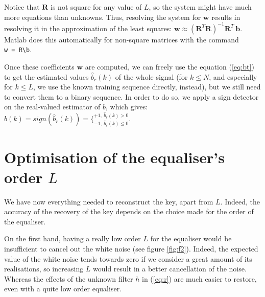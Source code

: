 \documentclass[twocolumn, 12pt]{IEEEtran}
\begin{document}
Notice that $\bm{R}$ is not square for any value of $L$, so the system might have much more equations than unknowns. Thus, resolving the system for $\bm{w}$ results in resolving it in the approximation of the least squares: $\bm{w} \approx (\bm{R}^{T}\bm{R})^{-1}\bm{R}^{T}~\bm{b}$. Matlab does this automatically for non-square matrices with the command \texttt{w~=~R\textbackslash b}.

Once these coefficients $\bm{w}$ are computed, we can freely use the equation (\ref{eq:bt}) to get the estimated values $\hat{b}_{r}(k)$ of the whole signal (for $k \leq N$, and especially for $k \leq L$, we use the known training sequence directly, instead), but we still need to convert them to a binary sequence. In order to do so, we apply a sign detector on the real-valued estimator of $b$, which gives: $\hat{b}(k) = sign(\hat{b}_{r}(k)) = \{_{-1,~\hat{b}_{r}(k) \leq 0}^{+1,~\hat{b}_{r}(k) > 0}$.

\section{Optimisation of the equaliser's order $L$}
We have now everything needed to reconstruct the key, apart from $L$. Indeed, the accuracy of the recovery of the key depends on the choice made for the order of the equaliser.

On the first hand, having a really low order $L$ for the equaliser would be insufficient to cancel out the white noise (see figure \ref{fig:f2}). Indeed, the expected value of the white noise tends towards zero if we consider a great amount of its realisations, so increasing $L$ would result in a better cancellation of the noise. Whereas the effects of the unknown filter $h$ in (\ref{eq:r}) are much easier to restore, even with a quite low order equaliser.
\end{document}
